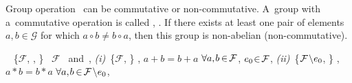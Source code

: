 Group operation~\inquotes{$\circ\hspace{.1ex}$}
can be
commutative
or non-commutative.
%
A~group
with a~commutative operation
is called
,
.
%
If there exists
at least one
pair of elements ${a, b \in \mathcal{G}}$
for which ${a \circ b \neq b \circ a}$,
then this group is non-abelian (non-commutative).

\emph{}~%
\{\hspace{.3ex}$\mathcal{F}$\hspace{-0.2ex},\hspace{-0.4ex} \inquotes{$+\hspace{.1ex}$},\hspace{-0.4ex} \inquotes{$*\hspace{.1ex}$}\hspace{.3ex}\}
~$\mathcal{F}$
\inquotes{$+\hspace{.1ex}$}~and~\inquotes{$*\hspace{.1ex}$},
\textit{(i)}~\{\hspace{.3ex}$\mathcal{F}$,\hspace{-0.4ex} \inquotes{$+\hspace{.1ex}$}\hspace{.3ex}\}\ru{\:---}
,
${a + b = b + a}$ ${\forall a, \hspace{-0.2ex} b \hspace{-0.2ex} \in \hspace{-0.3ex} \mathcal{F}}$,
 
${e_{0} {\hspace{.2ex} \in \hspace{.3ex}} \mathcal{F}}$,
\textit{(ii)}~\{\hspace{.3ex}$\mathcal{F} \hspace{-0.3ex} \setminus \hspace{-0.5ex} e_{0}$,\hspace{-0.4ex} \inquotes{$*\hspace{.1ex}$}\hspace{.3ex}\}\ru{\:---}
,
${a * b = b * a}$ ${\forall a, \hspace{-0.2ex} b \hspace{-0.2ex} \in \hspace{-0.3ex} \mathcal{F} \hspace{-0.3ex} \setminus \hspace{-0.5ex} e_{0}}$,

